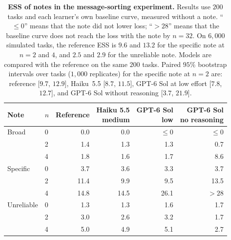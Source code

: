 \begin{table}[htbp]
\centering\small
\setlength{\tabcolsep}{4pt}
\caption[ESS of notes in the message-sorting experiment]{\textbf{ESS of notes in the message-sorting experiment.} Results use $200$ tasks and each learner's own baseline curve, measured without a note. ``$\leq0$'' means that the note did not lower loss; ``$>28$'' means that the baseline curve does not reach the loss with the note by $n=32$. On $6{,}000$ simulated tasks, the reference ESS is $9.6$ and $13.2$ for the specific note at $n=2$ and $4$, and $2.5$ and $2.9$ for the unreliable note. Models are compared with the reference on the same $200$ tasks. Paired $95\%$ bootstrap intervals over tasks ($1{,}000$ replicates) for the specific note at $n=2$ are: reference [$9.7$, $12.9$], Haiku~5.5 [$8.7$, $11.5$], GPT-6 Sol at low effort [$7.8$, $12.7$], and GPT-6 Sol without reasoning [$3.7$, $21.9$].}
\label{tab:semantic}\label{tab:filing}
\vspace{3pt}
\begin{tabular}{llrrrr}
\toprule
Note & $n$ & Reference & \shortstack{Haiku 5.5\\medium} & \shortstack{GPT-6 Sol\\low} & \shortstack{GPT-6 Sol\\no reasoning} \\
\midrule
Broad & 0 & 0.0 & 0.0 & $\leq0$ & $\leq0$ \\
& 2 & 1.4 & 1.3 & 1.3 & 0.7 \\
& 4 & 1.8 & 1.6 & 1.7 & 8.6 \\
\addlinespace
Specific & 0 & 3.7 & 3.6 & 3.3 & 3.7 \\
& 2 & 11.4 & 9.9 & 9.5 & 13.5 \\
& 4 & 14.8 & 14.5 & 26.1 & $>28$ \\
\addlinespace
Unreliable & 0 & 1.3 & 1.3 & 1.6 & 1.7 \\
& 2 & 3.0 & 2.6 & 3.2 & 1.7 \\
& 4 & 5.0 & 4.9 & 5.1 & 2.7 \\
\bottomrule
\end{tabular}
\end{table}
